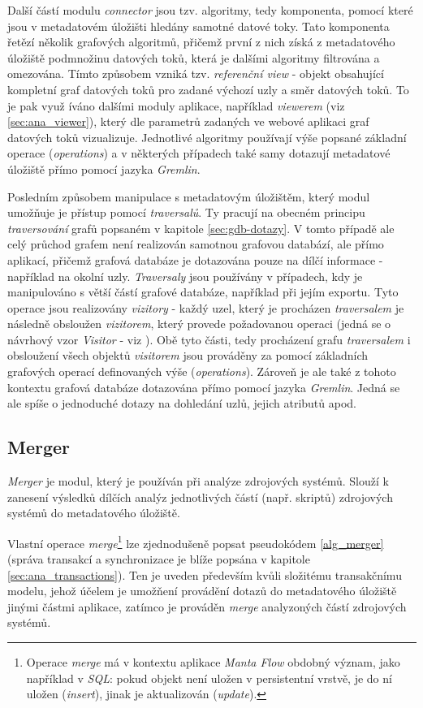 Další částí modulu \textit{connector} jsou tzv. algoritmy, tedy komponenta, pomocí které jsou v metadatovém úložišti hledány samotné datové toky. Tato komponenta řetězí několik grafových algoritmů, přičemž první z nich získá z metadatového úložiště podmnožinu datových toků, která je dalšími algoritmy filtrována a omezována. Tímto způsobem vzniká tzv. \textit{referenční view} - objekt obsahující kompletní graf datových toků pro zadané výchozí uzly a směr datových toků. To je pak využ   íváno dalšími moduly aplikace, například \textit{viewerem} (viz \ref{sec:ana_viewer}), který dle parametrů zadaných ve webové aplikaci graf datových toků vizualizuje.
Jednotlivé algoritmy používají výše popsané základní operace (\textit{operations}) a v některých případech také samy dotazují metadatové úložiště přímo pomocí jazyka \textit{Gremlin}.

Posledním způsobem manipulace s metadatovým úložištěm, který modul umožňuje je přístup pomocí \textit{traversalů}. Ty pracují na obecném principu \textit{traversování} grafů popsaném v kapitole \ref{sec:gdb-dotazy}. V tomto případě ale celý průchod grafem není realizován samotnou grafovou databází, ale přímo aplikací, přičemž grafová databáze je dotazována pouze na dílčí informace - například na okolní uzly. \textit{Traversaly} jsou používány v případech, kdy je manipulováno s větší částí grafové databáze, například při jejím exportu. Tyto operace jsou realizovány \textit{vizitory} - každý uzel, který je procházen \textit{traversalem} je následně obsloužen \textit{vizitorem}, který provede požadovanou operaci (jedná se o návrhový vzor \textit{Visitor} - viz \cite{Gamma94}). Obě tyto části, tedy procházení grafu \textit{traversalem} i obsloužení všech objektů \textit{visitorem} jsou prováděny za pomocí základních grafových operací definovaných výše (\textit{operations}). Zároveň je ale také z tohoto kontextu grafová databáze dotazována přímo pomocí jazyka \textit{Gremlin}. Jedná se ale spíše o jednoduché dotazy na dohledání uzlů, jejich atributů apod.

\subsection{Merger}
\label{sec:ana_merger}
\textit{Merger} je modul, který je používán při analýze zdrojových systémů. Slouží k zanesení výsledků dílčích analýz jednotlivých částí (např. skriptů) zdrojových systémů do metadatového úložiště.

Vlastní operace \textit{merge}\footnote{Operace \textit{merge} má v kontextu aplikace \textit{Manta Flow} obdobný význam, jako například v \textit{SQL}: pokud objekt není uložen v persistentní vrstvě, je do ní uložen (\textit{insert}), jinak je aktualizován (\textit{update}).} lze zjednodušeně popsat pseudokódem \ref{alg_merger} (správa transakcí a synchronizace je blíže popsána v kapitole \ref{sec:ana_transactions}). Ten je uveden především kvůli složitému transakčnímu modelu, jehož účelem je umožňení provádění dotazů do metadatového úložiště jinými částmi aplikace, zatímco je prováděn \textit{merge} analyzoných částí zdrojových systémů.

